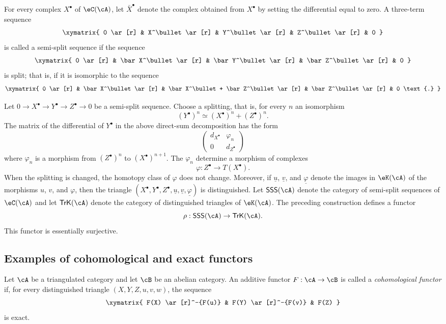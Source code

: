 \documentclass[oneside]{book}
\begin{document}
For every complex $X^\bullet$ of $\eC(\cA)$, let $\bar X^\bullet$ denote
the complex obtained from $X^\bullet$ by setting the differential equal
to zero. A three-term sequence
\[\xymatrix{
  0 \ar[r]
    & X^\bullet \ar[r]
    & Y^\bullet \ar[r]
    & Z^\bullet \ar[r]
    & 0
}\]
is called a semi-split sequence if the sequence
\[\xymatrix{
  0 \ar[r]
    & \bar X^\bullet \ar[r]
    & \bar Y^\bullet \ar[r]
    & \bar Z^\bullet \ar[r]
    & 0
}\]
is split; that is, if it is isomorphic to the sequence
\[\xymatrix{
  0 \ar[r]
    & \bar X^\bullet \ar[r]
    & \bar X^\bullet + \bar Z^\bullet \ar[r]
    & \bar Z^\bullet \ar[r]
    & 0 \text{.}
}\]

Let $0 \to X^\bullet \to Y^\bullet \to Z^\bullet \to 0$ be a semi-split
sequence. Choose a splitting, that is, for every $n$ an isomorphism
\[
  (Y^\bullet)^n \simeq (X^\bullet)^n + (Z^\bullet)^n \text{.}
\]
The matrix of the differential of $Y^\bullet$ in the above direct-sum
decomposition has the form
\[
  \begin{pmatrix}
    d_{X^\bullet} & \varphi_n \\
    0 & d_{Z^\bullet}
  \end{pmatrix}
\]
where $\varphi_n$ is a morphism from $(Z^\bullet)^n$ to
$(X^\bullet)^{n+1}$. The $\varphi_n$ determine a morphism of complexes
\[
  \varphi:Z^\bullet \to T(X^\bullet) \text{.}
\]
When the splitting is changed, the homotopy class of $\varphi$ does not
change. Moreover, if $\underline u$, $\underline v$, and
$\underline\varphi$ denote the images in $\eK(\cA)$ of the morphisms $u$,
$v$, and $\varphi$, then the triangle
$(X^\bullet,Y^\bullet,Z^\bullet,\underline u,\underline v,\underline\varphi)$
is distinguished. Let $\mathsf{SSS}(\cA)$ denote the category of
semi-split sequences of $\eC(\cA)$ and let $\mathsf{TrK}(\cA)$ denote the
category of distinguished triangles of $\eK(\cA)$. The preceding
construction defines a functor
\[
  \rho:\mathsf{SSS}(\cA) \to \mathsf{TrK}(\cA) \text{.}
\]
This functor is essentially surjective.

\subsection{Examples of cohomological and exact functors}\label{VIII:1-3}

\begin{definition}
Let $\cA$ be a triangulated category and let $\cB$ be an abelian category.
An additive functor $F:\cA\to \cB$ is called a \emph{cohomological
functor} if, for every distinguished triangle $(X,Y,Z,u,v,w)$, the
sequence
\[\xymatrix{
  F(X) \ar[r]^-{F(u)}
    & F(Y) \ar[r]^-{F(v)}
    & F(Z)
}\]
is exact.
\end{definition}
\end{document}
